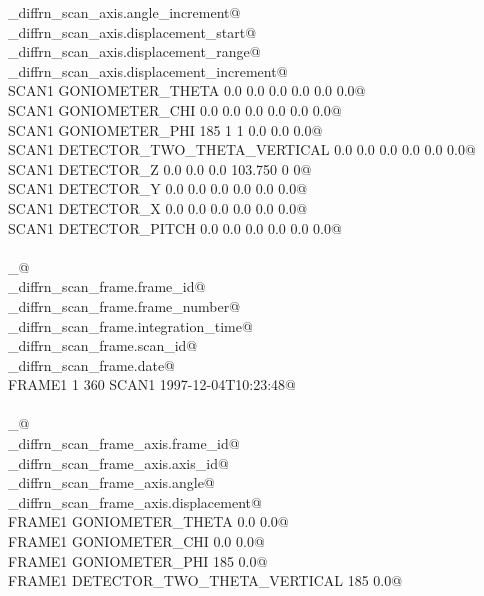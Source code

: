 \documentclass[10pt,a4paper,twoside,notitlepage]{article}
\begin{document}
\begin{flushleft}
\begin{minipage}{\linewidth}
\begin{list}{}{}
\mbox{}\verb@_diffrn_scan_axis.angle_increment@\\
\mbox{}\verb@_diffrn_scan_axis.displacement_start@\\
\mbox{}\verb@_diffrn_scan_axis.displacement_range@\\
\mbox{}\verb@_diffrn_scan_axis.displacement_increment@\\
\mbox{}\verb@ SCAN1 GONIOMETER_THETA 0.0 0.0 0.0 0.0 0.0 0.0@\\
\mbox{}\verb@ SCAN1 GONIOMETER_CHI 0.0 0.0 0.0 0.0 0.0 0.0@\\
\mbox{}\verb@ SCAN1 GONIOMETER_PHI 185 1 1 0.0 0.0 0.0@\\
\mbox{}\verb@ SCAN1 DETECTOR_TWO_THETA_VERTICAL 0.0 0.0 0.0 0.0 0.0 0.0@\\
\mbox{}\verb@ SCAN1 DETECTOR_Z 0.0 0.0 0.0 103.750 0 0@\\
\mbox{}\verb@ SCAN1 DETECTOR_Y 0.0 0.0 0.0 0.0 0.0 0.0@\\
\mbox{}\verb@ SCAN1 DETECTOR_X 0.0 0.0 0.0 0.0 0.0 0.0@\\
\mbox{}\verb@ SCAN1 DETECTOR_PITCH 0.0 0.0 0.0 0.0 0.0 0.0@\\
\mbox{}\verb@@\\
\mbox{}\verb@loop_@\\
\mbox{}\verb@_diffrn_scan_frame.frame_id@\\
\mbox{}\verb@_diffrn_scan_frame.frame_number@\\
\mbox{}\verb@_diffrn_scan_frame.integration_time@\\
\mbox{}\verb@_diffrn_scan_frame.scan_id@\\
\mbox{}\verb@_diffrn_scan_frame.date@\\
\mbox{}\verb@ FRAME1 1 360 SCAN1 1997-12-04T10:23:48@\\
\mbox{}\verb@@\\
\mbox{}\verb@loop_@\\
\mbox{}\verb@_diffrn_scan_frame_axis.frame_id@\\
\mbox{}\verb@_diffrn_scan_frame_axis.axis_id@\\
\mbox{}\verb@_diffrn_scan_frame_axis.angle@\\
\mbox{}\verb@_diffrn_scan_frame_axis.displacement@\\
\mbox{}\verb@ FRAME1 GONIOMETER_THETA 0.0 0.0@\\
\mbox{}\verb@ FRAME1 GONIOMETER_CHI 0.0 0.0@\\
\mbox{}\verb@ FRAME1 GONIOMETER_PHI 185 0.0@\\
\mbox{}\verb@ FRAME1 DETECTOR_TWO_THETA_VERTICAL 185 0.0@\\

\end{list}
\end{minipage}
\end{flushleft}
\end{document}
